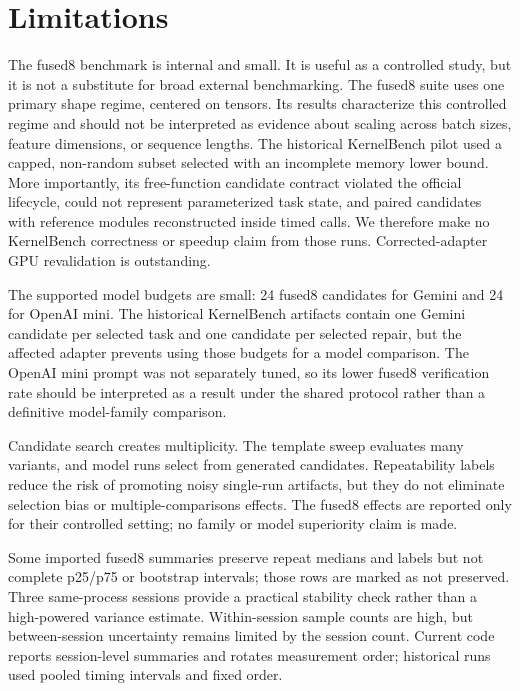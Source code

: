 \section{Limitations}

The fused8 benchmark is internal and small. It is useful as a controlled study, but it is not a substitute for broad external benchmarking. The fused8 suite uses one primary shape regime, centered on \code{[4096, 1024]} tensors. Its results characterize this controlled regime and should not be interpreted as evidence about scaling across batch sizes, feature dimensions, or sequence lengths. The historical KernelBench pilot used a capped, non-random subset selected with an incomplete memory lower bound. More importantly, its free-function candidate contract violated the official  lifecycle, could not represent parameterized task state, and paired candidates with reference modules reconstructed inside timed calls. We therefore make no KernelBench correctness or speedup claim from those runs. Corrected-adapter GPU revalidation is outstanding.

The supported model budgets are small: 24 fused8 candidates for Gemini and 24 for OpenAI mini. The historical KernelBench artifacts contain one Gemini candidate per selected task and one candidate per selected repair, but the affected adapter prevents using those budgets for a model comparison. The OpenAI mini prompt was not separately tuned, so its lower fused8 verification rate should be interpreted as a result under the shared protocol rather than a definitive model-family comparison.

Candidate search creates multiplicity. The template sweep evaluates many variants, and model runs select from generated candidates. Repeatability labels reduce the risk of promoting noisy single-run artifacts, but they do not eliminate selection bias or multiple-comparisons effects. The fused8 effects are reported only for their controlled setting; no family or model superiority claim is made.

Some imported fused8 summaries preserve repeat medians and labels but not complete p25/p75 or bootstrap intervals; those rows are marked as not preserved. Three same-process sessions provide a practical stability check rather than a high-powered variance estimate. Within-session sample counts are high, but between-session uncertainty remains limited by the session count. Current code reports session-level summaries and rotates measurement order; historical runs used pooled timing intervals and fixed order.

